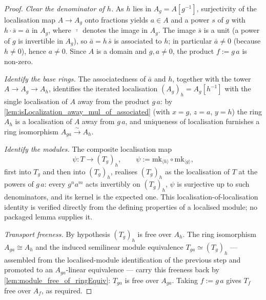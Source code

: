 \begin{proof}
  \leanok
  \emph{Clear the denominator of \(h\).} As \(h\) lies in \(A_g = A[g^{-1}]\),
  surjectivity of the localisation map \(A \to A_g\) onto fractions yields \(a \in A\) and a
  power \(s\) of \(g\) with \(h \cdot \bar s = \bar a\) in \(A_g\), where \(\bar{\,\cdot\,}\)
  denotes the image in \(A_g\). The image \(\bar s\) is a unit (a power of \(g\) is invertible
  in \(A_g\)), so \(\bar a = h\,\bar s\) is associated to \(h\); in particular \(\bar a \ne 0\)
  (because \(h \ne 0\)), hence \(a \ne 0\). Since \(A\) is a domain and \(g, a \ne 0\), the
  product \(f := g\,a\) is non-zero.

  \emph{Identify the base rings.} The associatedness of \(\bar a\) and \(h\), together with the
  tower \(A \to A_g \to A_h\), identifies the iterated localisation
  \((A_g)_h = A_g[h^{-1}]\) with the single localisation of \(A\) away from the product
  \(g\,a\): by \cref{lem:isLocalization_away_mul_of_associated} (with \(x = g\), \(z = a\),
  \(y = h\)) the ring \(A_h\) is a localisation of \(A\) away from \(g\,a\), and uniqueness of
  localisation furnishes a ring isomorphism \(A_{ga} \xrightarrow{\sim} A_h\).

  \emph{Identify the modules.} The composite localisation map
  \[
    \psi : T \longrightarrow (T_g)_h, \qquad
    \psi := \mathrm{mk}_{\langle h\rangle} \circ \mathrm{mk}_{\langle g\rangle},
  \]
  first into \(T_g\) and then into \((T_g)_h\), realises \((T_g)_h\) as the localisation of
  \(T\) at the powers of \(g\,a\): every \(g^n a^m\) acts invertibly on \((T_g)_h\), \(\psi\) is
  surjective up to such denominators, and its kernel is the expected one. This
  localisation-of-localisation identity is verified directly from the defining properties of a
  localised module; no packaged lemma supplies it.

  \emph{Transport freeness.} By hypothesis \((T_g)_h\) is free over \(A_h\). The ring
  isomorphism \(A_{ga} \cong A_h\) and the induced semilinear module equivalence
  \(T_{ga} \simeq (T_g)_h\) — assembled from the localised-module identification of the
  previous step and promoted to an \(A_{ga}\)-linear equivalence — carry this
  freeness back by \cref{lem:module_free_of_ringEquiv}: \(T_{ga}\) is free over
  \(A_{ga}\). Taking \(f := g\,a\) gives \(T_f\) free over \(A_f\), as required.
\end{proof}

